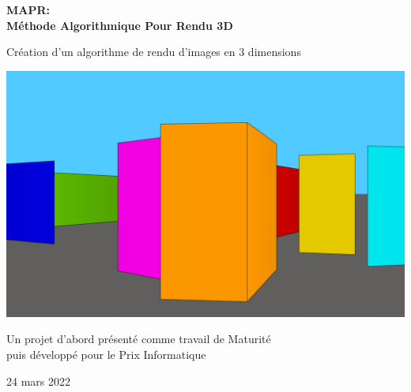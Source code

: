 \begin{titlepage}
	\begin{center}
		\vspace*{1cm}

		\Huge
		\textbf{MAPR: \\ Méthode Algorithmique Pour Rendu 3D}

		\vspace{0.5cm}
		\LARGE
		Création d’un algorithme de rendu d’images en 3 dimensions 

		\vspace{1.5cm}

		\textbf{\myauthor}

		\includegraphics{../img/CoverPic/Main_Pic4.png}

		\vfill
		Un projet d'abord présenté comme travail de Maturité \\
		puis développé pour le Prix Informatique
				
		\vspace{0.8cm}
		
		\Large
		24 mars 2022
	\end{center}
\end{titlepage}



\thispagestyle{empty}
